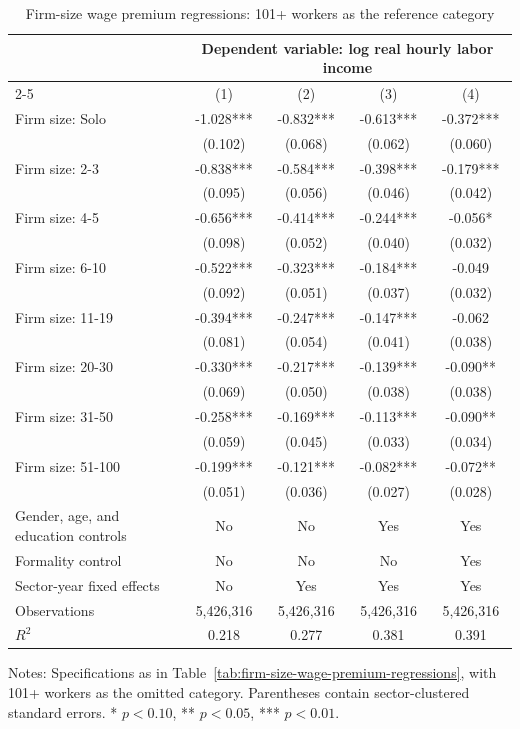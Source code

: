 \begin{table}[htbp]
  \centering
  \caption{Firm-size wage premium regressions: 101+ workers as the reference category}
  \label{tab:firm-size-wage-premium-regressions-101-reference}
  \small
  \begin{tabular}{lcccc}
    \toprule
    & \multicolumn{4}{c}{Dependent variable: log real hourly labor income} \\
    \cmidrule(lr){2-5}
    & (1) & (2) & (3) & (4) \\
    \midrule
    Firm size: Solo & -1.028*** & -0.832*** & -0.613*** & -0.372*** \\
     & (0.102) & (0.068) & (0.062) & (0.060) \\
    Firm size: 2-3 & -0.838*** & -0.584*** & -0.398*** & -0.179*** \\
     & (0.095) & (0.056) & (0.046) & (0.042) \\
    Firm size: 4-5 & -0.656*** & -0.414*** & -0.244*** & -0.056* \\
     & (0.098) & (0.052) & (0.040) & (0.032) \\
    Firm size: 6-10 & -0.522*** & -0.323*** & -0.184*** & -0.049 \\
     & (0.092) & (0.051) & (0.037) & (0.032) \\
    Firm size: 11-19 & -0.394*** & -0.247*** & -0.147*** & -0.062 \\
     & (0.081) & (0.054) & (0.041) & (0.038) \\
    Firm size: 20-30 & -0.330*** & -0.217*** & -0.139*** & -0.090** \\
     & (0.069) & (0.050) & (0.038) & (0.038) \\
    Firm size: 31-50 & -0.258*** & -0.169*** & -0.113*** & -0.090** \\
     & (0.059) & (0.045) & (0.033) & (0.034) \\
    Firm size: 51-100 & -0.199*** & -0.121*** & -0.082*** & -0.072** \\
     & (0.051) & (0.036) & (0.027) & (0.028) \\
    \midrule
    Gender, age, and education controls & No & No & Yes & Yes \\
    Formality control & No & No & No & Yes \\
    Sector-year fixed effects & No & Yes & Yes & Yes \\
    Observations & 5,426,316 & 5,426,316 & 5,426,316 & 5,426,316 \\
    $R^2$ & 0.218 & 0.277 & 0.381 & 0.391 \\
    \bottomrule
  \end{tabular}
  \vspace{0.3em}
  \begin{minipage}{0.95\textwidth}
  \footnotesize
  Notes: Specifications as in Table~\ref{tab:firm-size-wage-premium-regressions}, with 101+ workers as the omitted category. Parentheses contain sector-clustered standard errors. * $p<0.10$, ** $p<0.05$, *** $p<0.01$.
  \end{minipage}
\end{table}
